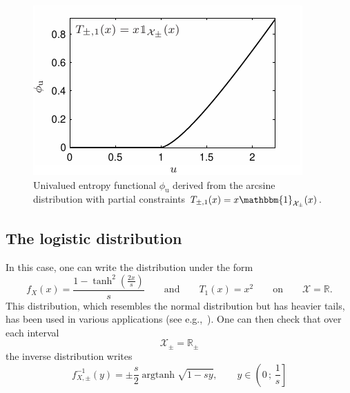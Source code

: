 \documentclass[entropy,article,submit,moreauthors,pdftex]{Definitions/mdpi}
\newcommand{\SZ}[1]{{\color{blue} #1}}                                       %
\newcommand{\Avoir}[1]{{\color{red}\bf #1}}                                  %
\def\Rset{\mathbb{R}}%
\def\X{\mathcal{X}}%
\def\un{\mathbbm{1}}%
\def\argtanh{\operatorname{argtanh}}%
\def\u{\mathrm{u}}
\begin{document}
\begin{figure}[htbp]
  \begin{minipage}{.6\columnwidth}
    \centerline{\includegraphics[width=.9\textwidth]{PDF/MaxEnt_ArcsineLaw}}
  \end{minipage}
  \begin{minipage}{.4\columnwidth}
\caption{\SZ{Univalued e}ntropy  functional   $\phi_\u$  derived  from   the  arcsine
  distribution with partial constraints $T_{\pm,1}(x) = x \un_{\X_\pm}(x)$.}
\label{fig:Entropy-arcsin}
  \end{minipage}
\end{figure}




\subsection{The logistic distribution}
\label{subsecapp:Logistic}

In this case, \SZ{one can write the distribution under the form
%
\[
f_X(x)  = \frac{1  -  \tanh^2\left(\frac{2 x}{s}\right)}{s} \qquad  \mbox{and}
\qquad T_1(x) = x^2 \qquad \mbox{on} \qquad \X = \Rset.
\]
}
This  distribution, which  resembles  the normal  distribution  but has  heavier
tails,     has     been     used    in     various     \SZ{applications     (see
  e.g.,~\cite{JohKot95:v2})}. One can then check that over each interval
%
\[
\X_\pm = \Rset_\pm
\]
%
the inverse distribution writes \SZ{
%
\[
f_{X,\pm}^{-1}(y) = \pm \frac{s}{2} \argtanh \sqrt{1 - s y}, \qquad y \in \left( 0 \, ; \,
  \frac{1}{s} \right]
\]
}
\end{document}
